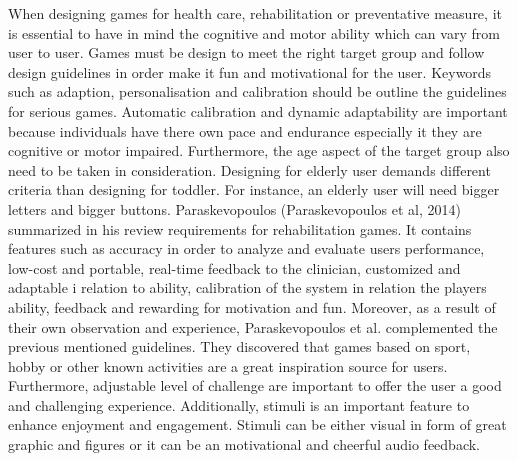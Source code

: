 \newline
When designing games for health care, rehabilitation or preventative measure, it is essential to have in mind the cognitive and motor ability which can vary from user to user. Games must be design to meet the right target group and follow design guidelines in order make it fun and motivational for the user. Keywords such as adaption, personalisation and calibration should be outline the guidelines for serious games. Automatic calibration and dynamic adaptability are important because individuals have there own pace and endurance especially it they are cognitive or motor impaired. Furthermore, the age aspect of the target group also need to be taken in consideration. Designing for elderly user demands different criteria than designing for toddler. For instance, an elderly user will need bigger letters and bigger buttons. Paraskevopoulos (Paraskevopoulos et al, 2014) summarized in his review requirements for rehabilitation games. It contains features such as accuracy in order to analyze and evaluate users performance, low-cost and portable, real-time feedback to the clinician, customized and adaptable i relation to ability, calibration of the system in relation the players ability, feedback and rewarding for motivation and fun. Moreover, as a result of their own observation and experience, Paraskevopoulos et al. complemented the previous mentioned guidelines. They discovered that games based on sport, hobby or other known activities are a great inspiration source for users. Furthermore, adjustable level of challenge are important to offer the user a good and challenging experience. Additionally, stimuli is an important feature to enhance enjoyment and engagement. Stimuli can be either visual in form of great graphic and figures or it can be an motivational and cheerful audio feedback.




